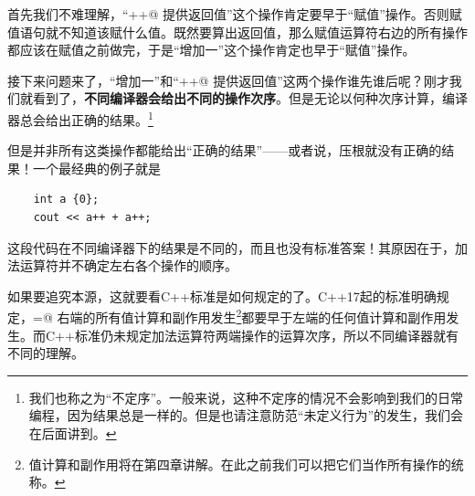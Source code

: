 首先我们不难理解，``\lstinline@a++@ 提供返回值''这个操作肯定要早于``赋值''操作。否则赋值语句就不知道该赋什么值。既然要算出返回值，那么赋值运算符右边的所有操作都应该在赋值之前做完，于是``\lstinline@a@ 增加一''这个操作肯定也早于``赋值''操作。\par
接下来问题来了，``\lstinline@a@ 增加一''和``\lstinline@a++@ 提供返回值''这两个操作谁先谁后呢？刚才我们就看到了，\textbf{不同编译器会给出不同的操作次序}。但是无论以何种次序计算，编译器总会给出正确的结果。\footnote{我们也称之为``不定序''。一般来说，这种不定序的情况不会影响到我们的日常编程，因为结果总是一样的。但是也请注意防范``未定义行为''的发生，我们会在后面讲到。}\par
但是并非所有这类操作都能给出``正确的结果''——或者说，压根就没有正确的结果！一个最经典的例子就是
\begin{lstlisting}
    int a {0};
    cout << a++ + a++;
\end{lstlisting}
这段代码在不同编译器下的结果是不同的，而且也没有标准答案！其原因在于，加法运算符并不确定左右各个操作的顺序。\par
如果要追究本源，这就要看C++标准是如何规定的了。C++17起的标准明确规定，\lstinline@=@ 右端的所有值计算和副作用发生\footnote{值计算和副作用将在第四章讲解。在此之前我们可以把它们当作所有操作的统称。}都要早于左端的任何值计算和副作用发生。而C++标准仍未规定加法运算符两端操作的运算次序，所以不同编译器就有不同的理解。\par
